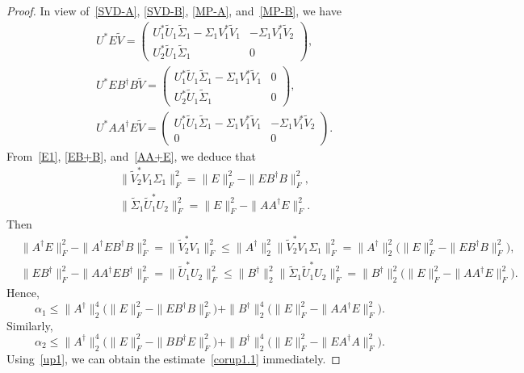 \documentclass[11pt]{article}
\begin{document}
\begin{proof}
In view of~\eqref{SVD-A}, \eqref{SVD-B}, \eqref{MP-A}, and~\eqref{MP-B}, we have
\begin{align}
&U^{\ast}E\widetilde{V}=\begin{pmatrix}
U_{1}^{\ast}\widetilde{U}_{1}\widetilde{\Sigma}_{1}-\Sigma_{1}V_{1}^{\ast}\widetilde{V}_{1} & -\Sigma_{1}V_{1}^{\ast}\widetilde{V}_{2} \\
U_{2}^{\ast}\widetilde{U}_{1}\widetilde{\Sigma}_{1} & 0
\end{pmatrix},\label{E1}\\
&U^{\ast}EB^{\dagger}B\widetilde{V}=\begin{pmatrix}
U_{1}^{\ast}\widetilde{U}_{1}\widetilde{\Sigma}_{1}-\Sigma_{1}V_{1}^{\ast}\widetilde{V}_{1} & 0 \\
U_{2}^{\ast}\widetilde{U}_{1}\widetilde{\Sigma}_{1} & 0
\end{pmatrix},\label{EB+B}\\
&U^{\ast}AA^{\dagger}E\widetilde{V}=\begin{pmatrix}
U_{1}^{\ast}\widetilde{U}_{1}\widetilde{\Sigma}_{1}-\Sigma_{1}V_{1}^{\ast}\widetilde{V}_{1} & -\Sigma_{1}V_{1}^{\ast}\widetilde{V}_{2} \\
0 & 0
\end{pmatrix}.\label{AA+E}
\end{align}
From~\eqref{E1}, \eqref{EB+B}, and~\eqref{AA+E}, we deduce that
\begin{align*}
&\|\widetilde{V}_{2}^{\ast}V_{1}\Sigma_{1}\|_{F}^{2}=\|E\|_{F}^{2}-\|EB^{\dagger}B\|_{F}^{2},\\ &\|\widetilde{\Sigma}_{1}\widetilde{U}_{1}^{\ast}U_{2}\|_{F}^{2}=\|E\|_{F}^{2}-\|AA^{\dagger}E\|_{F}^{2}.
\end{align*}
Then
\begin{align*}
&\|A^{\dagger}E\|_{F}^{2}-\|A^{\dagger}EB^{\dagger}B\|_{F}^{2}=\|\widetilde{V}_{2}^{\ast}V_{1}\|_{F}^{2}\leq\|A^{\dagger}\|_{2}^{2}\|\widetilde{V}_{2}^{\ast}V_{1}\Sigma_{1}\|_{F}^{2}=\|A^{\dagger}\|_{2}^{2}\big(\|E\|_{F}^{2}-\|EB^{\dagger}B\|_{F}^{2}\big),\\
&\|EB^{\dagger}\|_{F}^{2}-\|AA^{\dagger}EB^{\dagger}\|_{F}^{2}=\|\widetilde{U}_{1}^{\ast}U_{2}\|_{F}^{2}\leq\|B^{\dagger}\|_{2}^{2}\|\widetilde{\Sigma}_{1}\widetilde{U}_{1}^{\ast}U_{2}\|_{F}^{2}=\|B^{\dagger}\|_{2}^{2}\big(\|E\|_{F}^{2}-\|AA^{\dagger}E\|_{F}^{2}\big).
\end{align*}
Hence,
\begin{displaymath}
\alpha_{1}\leq\|A^{\dagger}\|_{2}^{4}\big(\|E\|_{F}^{2}-\|EB^{\dagger}B\|_{F}^{2}\big)+\|B^{\dagger}\|_{2}^{4}\big(\|E\|_{F}^{2}-\|AA^{\dagger}E\|_{F}^{2}\big).
\end{displaymath}
Similarly,
\begin{displaymath}
\alpha_{2}\leq\|A^{\dagger}\|_{2}^{4}\big(\|E\|_{F}^{2}-\|BB^{\dagger}E\|_{F}^{2}\big)+\|B^{\dagger}\|_{2}^{4}\big(\|E\|_{F}^{2}-\|EA^{\dagger}A\|_{F}^{2}\big).
\end{displaymath}
Using~\eqref{up1}, we can obtain the estimate~\eqref{corup1.1} immediately.
\end{proof}
\end{document}

